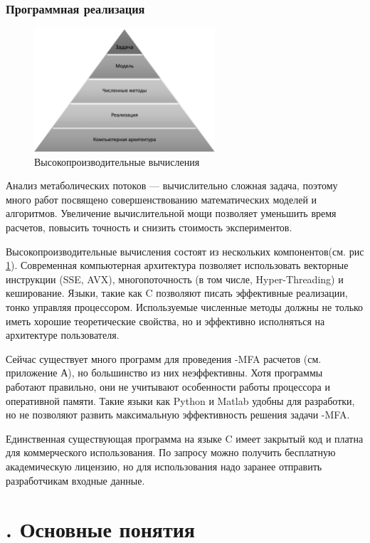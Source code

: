 \documentclass[14pt, a4paper]{extreport}
\newcommand{\CC}{C\nolinebreak\hspace{-.05em}\raisebox{.4ex}{\tiny\bf +}\nolinebreak\hspace{-.10em}\raisebox{.4ex}{\tiny\bf +}}
\def\CC{{C\nolinebreak[4]\hspace{-.05em}\raisebox{.4ex}{\tiny\bf ++}}} %
\begin{document}
\clearpage
\subsection{Программная реализация}
\begin{figure}[b]
	\centering
	\includegraphics[width=0.60\textwidth]{hpc.png}
	\caption{Высокопроизводительные вычисления}
	\label{hpc}
\end{figure}
Анализ метаболических потоков --- вычислительно сложная задача, поэтому много работ посвящено совершенствованию математических моделей и алгоритмов. Увеличение вычислительной мощи позволяет уменьшить время расчетов, повысить точность и снизить стоимость экспериментов.

Высокопроизводительные вычисления состоят из нескольких компонентов(см. рис \ref{hpc}). Современная компьютерная архитектура позволяет использовать векторные инструкции (SSE, AVX), многопоточность (в том числе, Hyper-Threading) и кеширование. Языки, такие как \CC{} позволяют писать эффективные реализации, тонко управляя процессором. Используемые численные методы должны не только иметь хорошие теоретические свойства, но и эффективно исполняться на архитектуре пользователя.

Сейчас существует много программ для проведения -MFA расчетов (см. приложение А), но большинство из них неэффективны. Хотя программы работают правильно, они не учитывают особенности работы процессора и оперативной памяти. Такие языки как Python и Matlab удобны для разработки, но не позволяют развить максимальную эффективность решения задачи -MFA.

Единственная существующая программа на языке \CC{} имеет закрытый код и платна для коммерческого использования. По запросу можно получить бесплатную академическую лицензию, но для использования надо заранее отправить разработчикам входные данные.

\chapter[Основные понятия]{\thechapter{}. Основные понятия}
\end{document}
